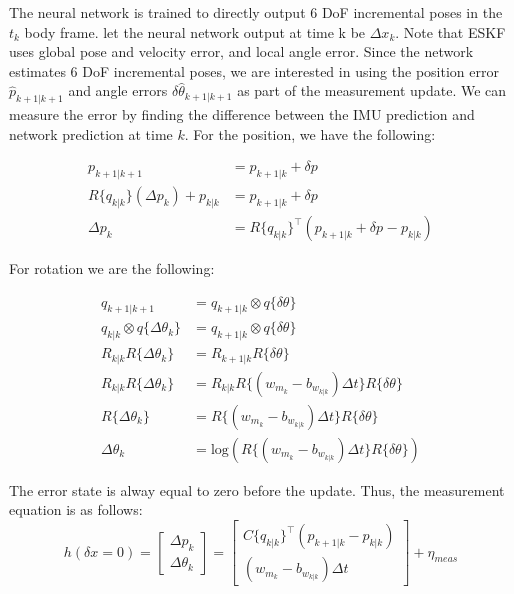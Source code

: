 \documentclass[]{article}
\begin{document}
The neural network is trained to directly output 6 DoF incremental poses in the $t_k$ body frame. let the neural network output at time k be $\Delta x_k$. Note that ESKF uses global pose and velocity error, and local angle error. Since the network estimates 6 DoF incremental poses, we are interested in using the position error $\hat{p}_{k+1|k+1}$ and angle errors $\delta \hat{\theta}_{k+1|k+1}$ as part of the measurement update. We can measure the error by finding the difference between the IMU prediction and network prediction at time $k$. For the position, we have the following:

\begin{align}
p_{k+1|k+1} &= p_{k+1|k} + \delta p \\
R\{q_{k|k}\}(\Delta p_k) + p_{k|k} &= p_{k+1|k} + \delta p \\
\Delta p_k &= R\{q_{k|k}\}^{\intercal}(p_{k+1|k} + \delta p_{} - p_{k|k})
\end{align}

For rotation we are the following:

\begin{align}
q_{k+1|k+1} &= q_{k+1|k} \otimes q\{\delta \theta\} \\
q_{k|k} \otimes q\{\Delta \theta_k\} &= q_{k+1|k} \otimes q\{\delta \theta\} \\
R_{k|k} R\{\Delta \theta_k\} &= R_{k+1|k} R\{\delta \theta\} \\
R_{k|k} R\{\Delta \theta_k\} &= R_{k|k} R\{(w_{m_k}-b_{w_{k|k}}) \Delta t\} R\{\delta \theta\} \\
R\{\Delta \theta_k\} &= R\{(w_{m_k}-b_{w_{k|k}}) \Delta t\} R\{\delta \theta\} \\
\Delta \theta_k &= \mathrm{log}(R\{(w_{m_k}-b_{w_{k|k}}) \Delta t\} R\{\delta \theta\})
\end{align}

The error state is alway equal to zero before the update. Thus, the measurement equation is as follows:
\begin{equation}
h(\delta x = 0) = 
\begin{bmatrix}
\Delta p_k \\
\Delta \theta_k
\end{bmatrix} =
\begin{bmatrix}
C\{q_{k|k}\}^{\intercal}(p_{k+1|k} - p_{k|k}) \\
(w_{m_k}-b_{w_{k|k}}) \Delta t
\end{bmatrix} + \eta_{meas}
\end{equation}
\end{document}
